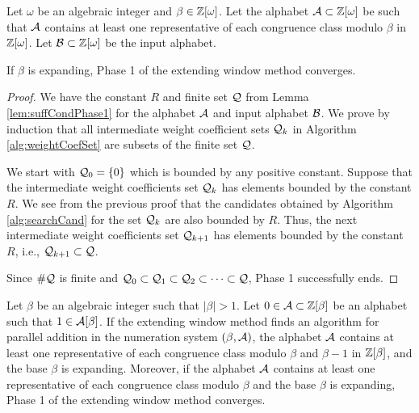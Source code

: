 \begin{thm}
\label{thm:suffCondPhase1}
Let $\omega$ be an algebraic integer and $\beta\in\mathbb{Z}[\omega]$. Let the alphabet $\mathcal{A}\subset\mathbb{Z}[\omega]$ be such that $\mathcal{A}$ contains at least one representative of each congruence class modulo $\beta$ in $\mathbb{Z}[\omega]$. Let $\mathcal{B}\subset\mathbb{Z}[\omega]$ be the input alphabet. 

If $\beta$ is expanding, Phase 1 of the extending window method converges.
\end{thm}
\begin{proof}
We have the constant $R$ and finite set $\mathcal{Q}$ from Lemma \ref{lem:suffCondPhase1} for the alphabet $\mathcal{A}$ and input alphabet $\mathcal{B}$. We prove by induction that  all intermediate weight coefficient sets $\mathcal{Q}_k$ in Algorithm \ref{alg:weightCoefSet} are subsets of the finite set $\mathcal{Q}$. 

We start with $\mathcal{Q}_0=\{0\}$ which is bounded by any positive constant. Suppose that the intermediate weight coefficients set $\mathcal{Q}_k$ has elements bounded by the constant $R$. We see from the previous  proof that the candidates obtained by Algorithm \ref{alg:searchCand} for the set $\mathcal{Q}_k$ are also bounded by $R$. Thus, the next intermediate weight coefficients set $\mathcal{Q}_{k+1}$ has elements bounded by the constant $R$, i.e., $\mathcal{Q}_{k+1}\subset\mathcal{Q}$. 

Since $\#\mathcal{Q}$ is finite and $\mathcal{Q}_0\subset\mathcal{Q}_1\subset\mathcal{Q}_2\subset\cdots\subset\mathcal{Q}$,  Phase 1 successfully ends. 
\end{proof}

\begin{thm}
Let $\beta$ be an algebraic integer such that $|\beta|>1$. Let $0\in \mathcal{A}\subset \mathbb{Z}[\beta]$ be an alphabet such that $1\in \mathcal{A}[\beta]$. If the extending window method finds an algorithm for parallel addition in the numeration system $(\beta, \mathcal{A})$, the alphabet $\mathcal{A}$ contains at least one representative of each congruence class modulo $\beta$ and $\beta-1$ in $\mathbb{Z}[\beta]$, and the base $\beta$ is expanding. Moreover, if the  alphabet $\mathcal{A}$ contains at least one representative of each congruence class modulo $\beta$ and the base $\beta$ is expanding, Phase 1 of the extending window method converges.
\end{thm}
